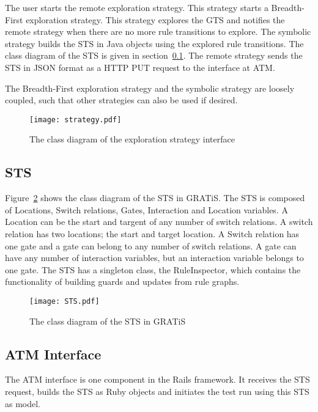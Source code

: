 The user starts the remote exploration strategy. This strategy starts a Breadth-First exploration strategy. This strategy explores the GTS and notifies the remote strategy when there are no more rule transitions to explore. The symbolic strategy builds the STS in Java objects using the explored rule transitions. The class diagram  of the STS is given in section~\ref{sec:sts-setup}. The remote strategy sends the STS in JSON format as a HTTP PUT request to the interface at ATM.

The Breadth-First exploration strategy and the symbolic strategy are loosely coupled, such that other strategies can also be used if desired.
 
\begin{figure}[ht]
  \begin{center}
    \texttt{[image: strategy.pdf]}
  \end{center}
  \caption{The class diagram of the exploration strategy interface}
  \label{fig:esi-diagram}
\end{figure}

\subsection{STS}\label{sec:sts-setup}
Figure~\ref{fig:sts-diagram} shows the class diagram of the STS in GRATiS. The STS is composed of Locations, Switch relations, Gates, Interaction and Location variables. A Location can be the start and targent of any number of switch relations. A switch relation has two locations; the start and target location. A Switch relation has one gate and a gate can belong to any number of switch relations. A gate can have any number of interaction variables, but an interaction variable belongs to one gate. The STS has a singleton class, the RuleInspector, which contains the functionality of building guards and updates from rule graphs.

\begin{figure}[ht]
  \begin{center}
    \texttt{[image: STS.pdf]}
  \end{center}
  \caption{The class diagram of the STS in GRATiS}
  \label{fig:sts-diagram}
\end{figure}

\subsection{ATM Interface}
The ATM interface is one component in the Rails framework. It receives the STS request, builds the STS as Ruby objects and initiates the test run using this STS as model.

